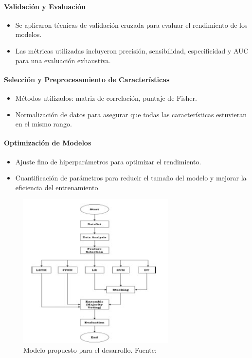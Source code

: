 \paragraph{Validación y Evaluación}

\begin{itemize}
\item Se aplicaron técnicas de validación cruzada para evaluar el rendimiento de los modelos.
\item Las métricas utilizadas incluyeron precisión, sensibilidad, especificidad y AUC para una evaluación exhaustiva.
\end{itemize}

\paragraph{Selección y Preprocesamiento de Características}

\begin{itemize}
\item Métodos utilizados: matriz de correlación, puntaje de Fisher.
\item Normalización de datos para asegurar que todas las características estuvieran en el mismo rango.
\end{itemize}

\paragraph{Optimización de Modelos}

\begin{itemize}
\item Ajuste fino de hiperparámetros para optimizar el rendimiento.
\item Cuantificación de parámetros para reducir el tamaño del modelo y mejorar la eficiencia del entrenamiento.
\end{itemize}

\begin{figure}[H]
    \centering
    \includegraphics[width=0.7\textwidth]{images_repo/modelopropuesto.jpg}
    \caption{Modelo propuesto para el desarrollo. Fuente: \cite{jiang2020heart}}
    \label{Propossed model}
\end{figure}

